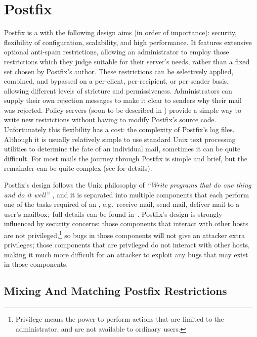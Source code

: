 \section{Postfix}

\label{postfix background}

Postfix is a  with the following design aims (in order of
importance): security, flexibility of configuration, scalability, and high
performance.  It features extensive optional anti-spam restrictions,
allowing an administrator to employ those restrictions which they judge
suitable for their server's needs, rather than a fixed set chosen by
Postfix's author.  These restrictions can be selectively applied, combined,
and bypassed on a per-client, per-recipient, or per-sender basis, allowing
different levels of stricture and permissiveness.  Administrators can
supply their own rejection messages to make it clear to senders why their
mail was rejected.  Policy servers (soon to be described in
) provide a simple way to write new restrictions
without having to modify Postfix's source code.  Unfortunately this
flexibility has a cost: the complexity of Postfix's log files.  Although it
is usually relatively simple to use standard Unix text processing utilities
to determine the fate of an individual mail, sometimes it can be quite
difficult.  For most mails the journey through Postfix is simple and brief,
but the remainder can be quite complex (see  for
details).

Postfix's design follows the Unix philosophy of \textit{``Write programs
that do one thing and do it well''\/}~\cite{unix-philosophy}, and it is
separated into multiple components that each perform one of the tasks
required of an , e.g.\ receive mail, send mail, deliver mail
to a user's mailbox;\ full details can be found in~\cite{postfix-overview}.
Postfix's design is strongly influenced by security concerns: those
components that interact with other hosts are not
privileged,\footnote{Privilege means the power to perform actions that are
limited to the administrator, and are not available to ordinary users.} so
bugs in those components will not give an attacker extra privileges; those
components that are privileged do not interact with other hosts, making it
much more difficult for an attacker to exploit any bugs that may exist in
those components.

\subsection{Mixing And Matching Postfix Restrictions}

